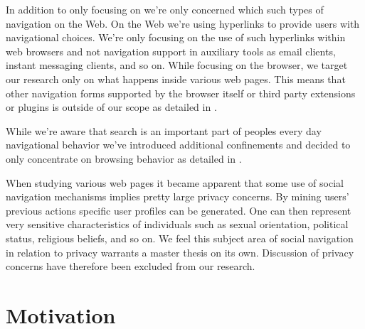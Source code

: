 In addition to only focusing on  we're only concerned
which such types of navigation on the Web.
On the Web we're using hyperlinks \citep[]{nelson65} to provide users
with navigational choices. We're only focusing on the use of such hyperlinks
within web browsers and not navigation support in auxiliary tools as email
clients, instant messaging clients, and so on. While focusing on the browser,
we target our research only on what happens inside various web pages. This
means that other navigation forms supported by the browser itself or third
party extensions or plugins is outside of our scope as detailed in
.

While we're aware that search is an important part of peoples every day
navigational behavior we've introduced additional confinements and decided to
only concentrate on browsing behavior as detailed in
.

When studying various web pages it became apparent that some use of
social navigation mechanisms implies pretty large privacy concerns. By mining
users' previous actions specific user profiles can be generated. One can then
represent very sensitive characteristics of individuals such as sexual
orientation, political status, religious beliefs, and so on.
We feel this subject area of social navigation in relation to privacy warrants
a master thesis on its own. Discussion of privacy concerns have therefore
been excluded from our research.


\section{Motivation}

